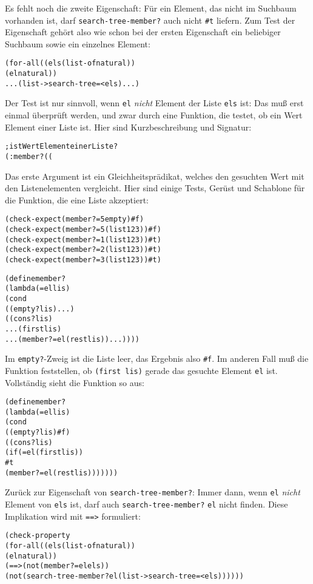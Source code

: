 %
Es fehlt noch die zweite Eigenschaft: Für ein Element, das nicht im
Suchbaum vorhanden ist, darf \texttt{search-tree-member?} auch nicht
\verb|#t| liefern.  Zum Test der Eigenschaft gehört also wie schon bei
der ersten Eigenschaft ein beliebiger Suchbaum sowie ein einzelnes Element:
%
\begin{alltt}
(for-all ((els (list-of natural))
          (el natural))
  ... (list->search-tree = < els) ...)
\end{alltt}
%
Der Test ist nur sinnvoll, wenn \texttt{el} \emph{nicht} Element der Liste
\texttt{els} ist: Das muß erst einmal überprüft werden, und zwar durch
eine Funktion, die testet, ob ein Wert Element einer Liste ist.  Hier
sind Kurzbeschreibung und Signatur:
%
\begin{alltt}
; ist Wert Element einer Liste?
(: member? ((%a %a -> boolean) %a (list-of %a) -> boolean))
\end{alltt}
%
Das erste Argument ist ein Gleichheitsprädikat, welches den gesuchten
Wert mit den Listenelementen vergleicht.  Hier sind einige Tests,
Gerüst und Schablone für die Funktion, die eine Liste akzeptiert:
%
\begin{alltt}
(check-expect (member? = 5 empty) #f)
(check-expect (member? = 5 (list 1 2 3)) #f)
(check-expect (member? = 1 (list 1 2 3)) #t)
(check-expect (member? = 2 (list 1 2 3)) #t)
(check-expect (member? = 3 (list 1 2 3)) #t)

(define member?
  (lambda (= el lis)
    (cond
      ((empty? lis) ...)
      ((cons? lis)
       ... (first lis)
       ... (member? = el (rest lis)) ...))))
\end{alltt}
%
Im \texttt{empty?}-Zweig ist die Liste leer, das Ergebnis also
\verb|#f|.  Im anderen Fall muß die Funktion feststellen, ob
\texttt{(first lis)} gerade das gesuchte Element \texttt{el} ist.
Vollständig sieht die Funktion so aus:
%
\begin{alltt}
(define member?
  (lambda (= el lis)
    (cond
      ((empty? lis) #f)
      ((cons? lis)
       (if (= el (first lis))
           #t
           (member? = el (rest lis)))))))
\end{alltt}
%
Zurück zur Eigenschaft von \texttt{search-tree-member?}: Immer dann,
wenn \texttt{el} \emph{nicht} Element von \texttt{els} ist, darf auch
\texttt{search-tree-member?} \texttt{el} nicht finden.  Diese
Implikation wird mit \texttt{==>} formuliert:
%
\begin{alltt}
(check-property
 (for-all ((els (list-of natural))
           (el natural))
   (==> (not (member? = el els))
        (not (search-tree-member? el (list->search-tree = < els)))))) 
\end{alltt}
